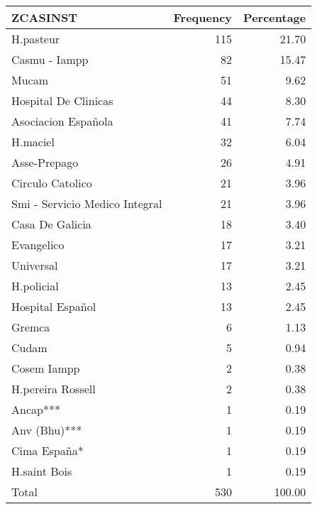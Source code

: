 
\begin{tabular}{lrr}
\toprule
ZCASINST & Frequency & Percentage\\
\midrule
H.pasteur & 115 & 21.70\\
Casmu - Iampp & 82 & 15.47\\
Mucam & 51 & 9.62\\
Hospital De Clinicas & 44 & 8.30\\
Asociacion Española & 41 & 7.74\\
\addlinespace
H.maciel & 32 & 6.04\\
Asse-Prepago & 26 & 4.91\\
Circulo Catolico & 21 & 3.96\\
Smi - Servicio Medico Integral & 21 & 3.96\\
Casa De Galicia & 18 & 3.40\\
\addlinespace
Evangelico & 17 & 3.21\\
Universal & 17 & 3.21\\
H.policial & 13 & 2.45\\
Hospital Español & 13 & 2.45\\
Gremca & 6 & 1.13\\
\addlinespace
Cudam & 5 & 0.94\\
Cosem Iampp & 2 & 0.38\\
H.pereira Rossell & 2 & 0.38\\
Ancap*** & 1 & 0.19\\
Anv (Bhu)*** & 1 & 0.19\\
\addlinespace
Cima España* & 1 & 0.19\\
H.saint Bois & 1 & 0.19\\
Total & 530 & 100.00\\
\bottomrule
\end{tabular}
